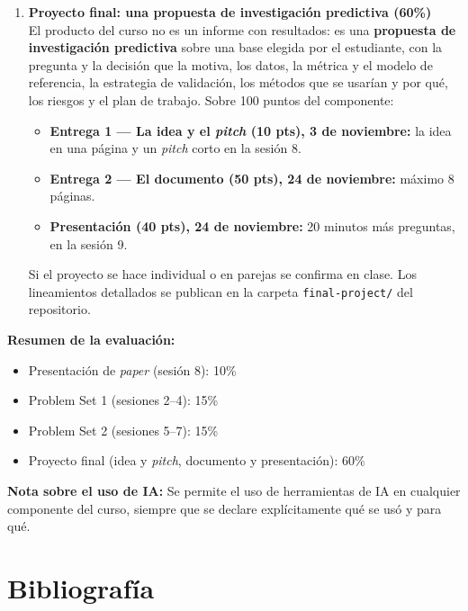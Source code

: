 \documentclass[12pt,a4paper]{article}
\begin{document}
\begin{enumerate}
    \item \textbf{Proyecto final: una propuesta de investigación predictiva (60\%)} \\
    El producto del curso no es un informe con resultados: es una \textbf{propuesta de investigación predictiva} sobre una base elegida por el estudiante, con la pregunta y la decisión que la motiva, los datos, la métrica y el modelo de referencia, la estrategia de validación, los métodos que se usarían y por qué, los riesgos y el plan de trabajo. Sobre 100 puntos del componente:
    \begin{itemize}
        \item \textbf{Entrega 1 --- La idea y el \emph{pitch} (10 pts), 3 de noviembre:} la idea en una página y un \emph{pitch} corto en la sesión 8.
        \item \textbf{Entrega 2 --- El documento (50 pts), 24 de noviembre:} máximo 8 páginas.
        \item \textbf{Presentación (40 pts), 24 de noviembre:} 20 minutos más preguntas, en la sesión 9.
    \end{itemize}
    Si el proyecto se hace individual o en parejas se confirma en clase. Los lineamientos detallados se publican en la carpeta \texttt{final-project/} del repositorio.
\end{enumerate}

\noindent \textbf{Resumen de la evaluación:}
\begin{itemize}
    \item Presentación de \emph{paper} (sesión 8): 10\%
    \item Problem Set 1 (sesiones 2--4): 15\%
    \item Problem Set 2 (sesiones 5--7): 15\%
    \item Proyecto final (idea y \emph{pitch}, documento y presentación): 60\%
\end{itemize}

\noindent \textbf{Nota sobre el uso de IA:} Se permite el uso de herramientas de IA en cualquier componente del curso, siempre que se declare explícitamente qué se usó y para qué.

\section{Bibliografía}
\end{document}
